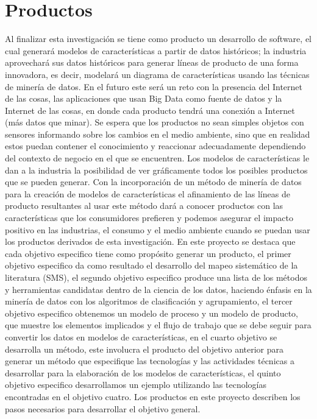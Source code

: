 \chapter{Productos}

Al finalizar esta investigación se tiene como producto un desarrollo de software, el cual generará modelos de características a partir de datos históricos; la industria aprovechará sus datos históricos para generar líneas de producto de una forma innovadora, es decir, modelará un diagrama de características usando las técnicas de minería de datos. En el futuro este será un reto con la presencia del Internet de las cosas, las aplicaciones que usan Big Data como fuente de datos y la Internet de las cosas, en donde cada producto tendrá una conexión a Internet (más datos que minar). Se espera que los productos no sean simples objetos con sensores informando sobre los cambios en el medio ambiente, sino que en realidad estos puedan contener el conocimiento y reaccionar adecuadamente dependiendo del contexto de negocio en el que se encuentren. Los modelos de características  le dan a la industria la posibilidad de ver gráficamente todos los posibles productos que se pueden generar. Con la incorporación de un método de minería de datos para la creación de modelos de características el afinamiento de las líneas de producto resultantes al usar este método dará a conocer productos con las características que los consumidores prefieren y podemos asegurar el impacto positivo en las industrias, el consumo y el medio ambiente cuando se puedan usar los productos derivados de esta investigación. 
En este proyecto se destaca que cada objetivo especifico tiene como propósito generar un producto, el primer objetivo especifico da como resultado el desarrollo del mapeo sistemático de la literatura (SMS), el segundo objetivo especifico produce una lista de los métodos y herramientas candidatas dentro de la ciencia de los datos, haciendo énfasis en la minería de datos con los algoritmos de clasificación y agrupamiento, el tercer objetivo especifico obtenemos un modelo de proceso y un modelo de producto, que muestre los elementos implicados y el flujo de trabajo que se debe seguir para convertir los datos en modelos de características, en el cuarto objetivo se desarrolla un método, este involucra el producto del objetivo anterior para generar un método que especifique las tecnologías y las actividades técnicas a desarrollar para la elaboración de los modelos de características, el quinto objetivo especifico desarrollamos un ejemplo utilizando las tecnologías encontradas en el objetivo cuatro. Los productos en este proyecto describen los pasos necesarios para desarrollar el objetivo general.  


